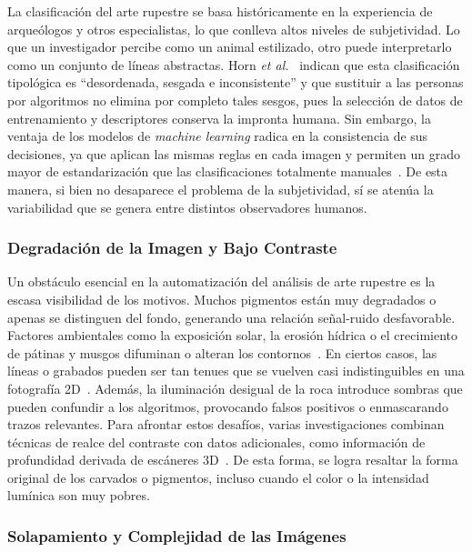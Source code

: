 La clasificación del arte rupestre se basa históricamente en la experiencia de arqueólogos y otros especialistas, lo que conlleva altos niveles de subjetividad.
Lo que un investigador percibe como un animal estilizado, otro puede interpretarlo como un conjunto de líneas abstractas.
Horn \textit{et al.}~\cite{horn2022} indican que esta clasificación tipológica es “desordenada, sesgada e inconsistente” y que sustituir a las personas por algoritmos no elimina por completo tales sesgos, pues la selección de datos de entrenamiento y descriptores conserva la impronta humana.
Sin embargo, la ventaja de los modelos de \textit{machine learning} radica en la consistencia de sus decisiones, ya que aplican las mismas reglas en cada imagen y permiten un grado mayor de estandarización que las clasificaciones totalmente manuales~\cite{jalandoni2022}.
De esta manera, si bien no desaparece el problema de la subjetividad, sí se atenúa la variabilidad que se genera entre distintos observadores humanos.

\subsubsection*{Degradación de la Imagen y Bajo Contraste}

Un obstáculo esencial en la automatización del análisis de arte rupestre es la escasa visibilidad de los motivos.
Muchos pigmentos están muy degradados o apenas se distinguen del fondo, generando una relación señal-ruido desfavorable.
Factores ambientales como la exposición solar, la erosión hídrica o el crecimiento de pátinas y musgos difuminan o alteran los contornos~\cite{horn2022,suhaimi2023}.
En ciertos casos, las líneas o grabados pueden ser tan tenues que se vuelven casi indistinguibles en una fotografía 2D~\cite{horn2022}.
Además, la iluminación desigual de la roca introduce sombras que pueden confundir a los algoritmos, provocando falsos positivos o enmascarando trazos relevantes.
Para afrontar estos desafíos, varias investigaciones combinan técnicas de realce del contraste con datos adicionales, como información de profundidad derivada de escáneres 3D~\cite{jalandoni2022}.
De esta forma, se logra resaltar la forma original de los carvados o pigmentos, incluso cuando el color o la intensidad lumínica son muy pobres.

\subsubsection*{Solapamiento y Complejidad de las Imágenes}

